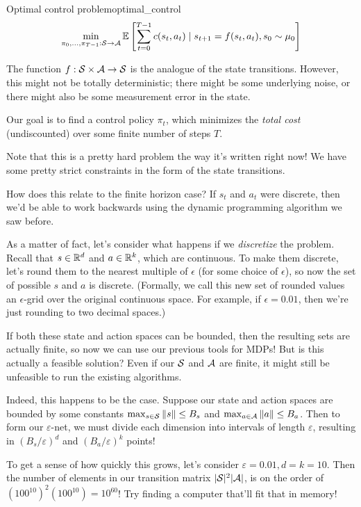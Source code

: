 \documentclass[../main/main]{subfiles}
\begin{document}
\begin{definition}{Optimal control problem}{optimal_control}
    \begin{equation}
        \min_{\pi_0, \dots, \pi_{T-1} : \mathcal{S} \to \mathcal{A}} \operatorname*{\mathbb{E}} \left[
            \sum_{t=0}^{T-1} c(s_t, a_t)
            \mid
            s_{t+1} = f(s_t, a_t),
            s_0 \sim \mu_0
        \right]
    \end{equation}

    The function $f : \mathcal{S} \times \mathcal{A} \to \mathcal{S}$ is the analogue of the
    state transitions. However, this might not be totally deterministic;
    there might be some underlying noise, or there might also be some
    measurement error in the state.

    Our goal is to find a control policy $\pi_t$, which minimizes the
    \emph{total cost} (undiscounted) over some finite number of steps $T$.

    Note that this is a pretty hard problem the way it's written right now!
    We have some pretty strict constraints in the form of the state transitions.

    How does this relate to the finite horizon case?
    If $s_t$ and $a_t$ were discrete, then we'd be able to work backwards using
    the dynamic programming algorithm we saw before.

    As a matter of fact, let's consider what happens if we \emph{discretize} the
    problem. Recall that $s \in \mathbb{R}^d$ and $a \in \mathbb{R}^k$, which are continuous.
    To make them discrete, let's round them to the nearest multiple of
    $\epsilon$ (for some choice of $\epsilon$), so now
    the set of possible $s$ and $a$ is discrete. (Formally, we call this new set
    of rounded values an $\epsilon$-grid over the original continuous space. For
    example, if $\epsilon = 0.01$, then we're just rounding to two decimal spaces.)

    If both these state and action spaces can be bounded, then the resulting
    sets are actually finite, so now we can use our previous tools for MDPs!
    But is this actually a feasible solution? Even if our $\mathcal{S}$ and $\mathcal{A}$ are
    finite, it might still be unfeasible to run the existing algorithms.

    Indeed, this happens to be the case. Suppose our state and action spaces
    are bounded by some constants $\max_{s \in \mathcal{S}} \|s\| \le B_s$ and
    $\max_{a \in \mathcal{A}} \|a\| \le B_a$. Then to form our $\varepsilon$-net,
    we must divide each dimension into intervals of length $\varepsilon$,
    resulting in $(B_s/\varepsilon)^d$ and $(B_a/\varepsilon)^k$ points!

    To get a sense of how quickly this grows, let's consider $\varepsilon = 0.01, d = k = 10$. Then the number of elements in our transition matrix $|\mathcal{S}|^2 |\mathcal{A}|$, is on the order of $(100^{10})^2 (100^{10}) = 10^{60}$!
    Try finding a computer that'll fit that in memory!
\end{definition}
\end{document}
